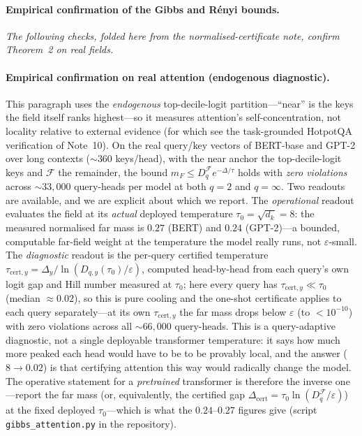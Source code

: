 \documentclass[10pt,twocolumn]{article}
\begin{document}
\paragraph{Empirical confirmation of the Gibbs and R\'enyi bounds.}
\emph{The following checks, folded here from the normalised-certificate note, confirm Theorem~2 on real fields.}

\paragraph{Empirical confirmation on real attention (endogenous diagnostic).} This paragraph uses the \emph{endogenous} top-decile-logit partition---``near'' is the keys the field itself ranks highest---so it measures attention's self-concentration, not locality relative to external evidence (for which see the task-grounded HotpotQA verification of Note~10). On the real query/key vectors of BERT-base and GPT-2 over long contexts ($\sim\!360$ keys/head), with the near anchor the top-decile-logit keys and $\mathcal{F}$ the remainder, the bound $m_F\le D_q^{\mathcal{F}}e^{-\Delta/\tau}$ holds with \emph{zero violations} across $\sim\!33{,}000$ query-heads per model at both $q=2$ and $q=\infty$. Two readouts are available, and we are explicit about which we report. The \emph{operational} readout evaluates the field at its \emph{actual} deployed temperature $\tau_0=\sqrt{d_k}=8$: the measured normalised far mass is $0.27$ (BERT) and $0.24$ (GPT-2)---a bounded, computable far-field weight at the temperature the model really runs, not $\varepsilon$-small. The \emph{diagnostic} readout is the per-query certified temperature $\tau_{\mathrm{cert},y}=\Delta_y/\ln(D_{q,y}(\tau_0)/\varepsilon)$, computed head-by-head from each query's own logit gap and Hill number measured at $\tau_0$; here every query has $\tau_{\mathrm{cert},y}\ll\tau_0$ (median $\approx0.02$), so this is pure cooling and the one-shot certificate applies to each query separately---at its own $\tau_{\mathrm{cert},y}$ the far mass drops below $\varepsilon$ (to $<10^{-10}$) with zero violations across all $\sim\!66{,}000$ query-heads. This is a query-adaptive diagnostic, not a single deployable transformer temperature: it says how much more peaked each head would have to be to be provably local, and the answer ($8\to0.02$) is that certifying attention this way would radically change the model. The operative statement for a \emph{pretrained} transformer is therefore the inverse one---report the far mass (or, equivalently, the certified gap $\Delta_{\mathrm{cert}}=\tau_0\ln(D_q^{\mathcal{F}}/\varepsilon)$) at the fixed deployed $\tau_0$---which is what the $0.24$--$0.27$ figures give (script \texttt{gibbs\_attention.py} in the repository).
\end{document}
